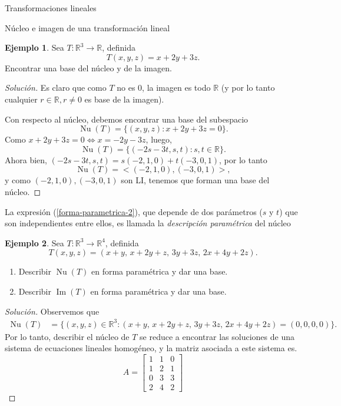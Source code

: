 \documentclass[a4paper,12pt,twoside,spanish]{amsbook}
\theoremstyle{definition}
\newtheorem{ejemplo}{Ejemplo}[section]
\theoremstyle{remark}
\newcommand{\img}{\operatorname{Im}}
\newcommand{\nuc}{\operatorname{Nu}}
\newcommand{\R}{\mathbb R}
\begin{document}
\begin{chapter}{Transformaciones lineales}
\begin{section}{Núcleo e imagen de una transformación lineal}
		\begin{ejemplo}
			Sea $T: \R^3 \to \R$, definida
			$$
			T(x,y,z) = x +2y +3z.
			$$
			Encontrar una base del núcleo y de la imagen.
			\begin{proof}[Solución]
				Es claro que como $T$ no es 0, la imagen es todo $\R$ (y por lo tanto cualquier $r\in \R, r \ne 0$ es base de la imagen). 
				
				Con respecto al núcleo,  debemos encontrar una base del subespacio
				$$
				\nuc(T) = \{(x,y,z): x+2y+3z =0\}.
				$$
				Como $x+2y+3z =0 \Leftrightarrow x = -2y-3z$, luego, 
				\begin{equation}\label{forma-parametrica-2}
					\nuc(T) =  \{(-2s-3t,s,t): s,t \in \R\}.
				\end{equation}
				Ahora bien, $(-2s-3t,s,t) = s(-2,1,0)+t(-3,0,1)$, por lo tanto 
				\begin{equation*}
				\nuc(T) =  <(-2,1,0),(-3,0,1)>,
				\end{equation*}
				y  como $(-2,1,0),(-3,0,1)$ son LI, tenemos que forman una base del núcleo. 
			\end{proof}
		
		La expresión (\ref{forma-parametrica-2}),  que depende de dos parámetros ($s$ y $t$) que son independientes entre ellos, es llamada la \textit{descripción paramétrica} del núcleo	
		\end{ejemplo}
		
		\begin{ejemplo}
		Sea $T: \R^3 \to \R^4$, definida
		$$
		T(x,y,z) = (x +y ,\,x +2y +z,\,3y +3z,\,2x +4y +2z).
		$$
		\begin{enumerate}
			\item Describir $\nuc(T)$  en forma paramétrica y dar una base.
			\item Describir $\img(T)$  en forma paramétrica y  dar una base. 
		\end{enumerate}
		\begin{proof}[Solución] 
		Observemos que 
		\begin{align*}
		\nuc(T) &= \{(x,y,z)\in \R^3: (x +y ,\,x +2y +z,\,3y +3z,\,2x +4y +2z) =(0,0,0,0)\}.
		\end{align*}
		Por  lo tanto, describir el núcleo de $T$ se reduce a encontrar las soluciones de una sistema de ecuaciones lineales homogéneo, y la matriz asociada a este sistema es.   
		\begin{equation*}
		A = \begin{bmatrix}
		1&1&0\\1&2&1\\0&3&3\\2&4&2
		\end{bmatrix}
		\end{equation*}
		

\end{proof}
\end{ejemplo}
\end{section}
\end{chapter}
\end{document}
